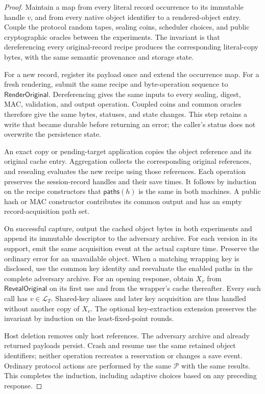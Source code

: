 \documentclass[pdflatex]{sn-jnl}
\theoremstyle{thmstyleone}
\theoremstyle{thmstylethree}
\theoremstyle{thmstyletwo}
\begin{document}
\begin{proof}
Maintain a map from every literal record occurrence to its immutable handle
$v$, and from every native object identifier to a rendered-object entry.
Couple the protocol random tapes, sealing coins, scheduler choices, and public
cryptographic oracles between the experiments.  The invariant is that
dereferencing every original-record recipe produces the corresponding
literal-copy bytes, with the same semantic provenance and storage state.

For a new record, register its payload once and extend the occurrence map.
For a fresh rendering, submit the same recipe and byte-operation sequence to
$\mathsf{RenderOriginal}$.  Dereferencing gives the same inputs to every
sealing, digest, MAC, validation, and output operation.  Coupled coins and
common oracles therefore give the same bytes, statuses, and state changes.
This step retains a write that became durable before returning an error;
the caller's status does not overwrite the persistence state.

An exact copy or pending-target application copies the object reference and
its original cache entry.  Aggregation collects the corresponding original
references, and resealing evaluates the new recipe using those references.
Each operation preserves the session-record handles and their save times.
It follows by induction on the recipe constructors that
$\mathsf{paths}(h)$ is the same in both machines.  A public hash or MAC
constructor contributes its common output and has an empty record-acquisition
path set.

On successful capture, output the cached object bytes in both experiments
and append its immutable descriptor to the adversary archive.  For each
version in its support, emit the same acquisition event at the actual
capture time.  Preserve the ordinary error for an unavailable object.
When a matching wrapping key is disclosed, use the common key identity and
reevaluate the enabled paths in the complete adversary archive.  For an
opening response, obtain $X_v$ from $\mathsf{RevealOriginal}$ on its first
use and from the wrapper's cache thereafter.  Every such call has
$v\in\mathcal L_T$.  Shared-key aliases and later key acquisition are thus
handled without another copy of $X_v$.  The optional key-extraction extension
preserves the invariant by induction on the least-fixed-point rounds.

Host deletion removes only host references.  The adversary archive and
already returned payloads persist.  Crash and resume use the same retained
object identifiers; neither operation recreates a reservation or changes a
save event.  Ordinary protocol actions are performed by the same
$\mathcal P$ with the same results.  This completes the induction, including
adaptive choices based on any preceding response.


\end{proof}
\end{document}
